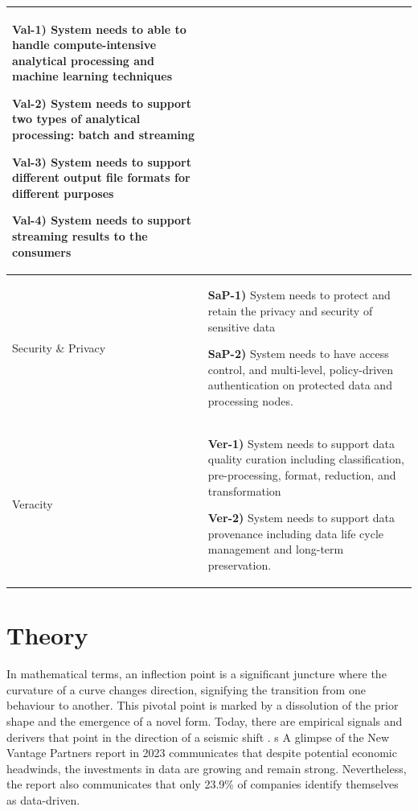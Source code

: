 \documentclass[preprint,12pt]{elsarticle}
\begin{document}
\begin{longtable}{|m{1.4cm}|m{12cm}|}
          \textbf{Val-1)} System needs to able to handle compute-intensive analytical processing and machine learning techniques 
          
          \textbf{Val-2)} System needs to support two types of analytical processing: batch and streaming
          
          \textbf{Val-3)} System needs to support different output file formats for different purposes 
          
          \textbf{Val-4)} System needs to support streaming results to the consumers 
          \\
  
          \hline
  
          Security \& Privacy & 
          
          \textbf{SaP-1)} System needs to protect and retain the privacy and security of sensitive data 
          
          \textbf{SaP-2)} System needs to have access control, and multi-level, policy-driven authentication on protected data and processing nodes. 
          \\
  
          \hline
          
          Veracity &
          
          \textbf{Ver-1)} System needs to support data quality curation including classification, pre-processing, format, reduction, and  transformation 
          
          \textbf{Ver-2)} System needs to support data provenance including data life cycle management and long-term preservation.
          \\
          \hline
  
  \end{longtable}


\section{Theory}
\label{sec:theory}

In mathematical terms, an inflection point is a significant juncture where the curvature of a curve changes direction, signifying the transition from one behaviour to another. This pivotal point is marked by a dissolution of the prior shape and the emergence of a novel form. Today, there are empirical signals and derivers that point in the direction of a seismic shift \cite{mit_tech_review_2023}. 
s
A glimpse of the New Vantage Partners report in 2023 communicates that despite potential economic headwinds, the investments in data are growing and remain strong. Nevertheless, the report also communicates that only 23.9\% of companies identify themselves as data-driven. 
\end{document}
